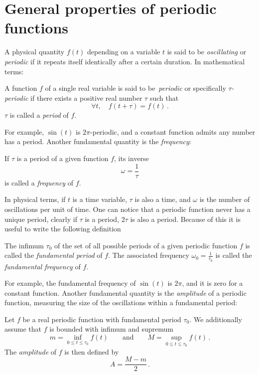 \section{General properties of periodic functions}
A physical quantity $f(t)$ depending on a variable $t$ is said to be \emph{oscillating} or
\emph{periodic} if it repeats itself identically after a certain duration. In mathematical
terms:
\begin{definition}
  A function $f$ of a single real variable is said to be~\emph{periodic} or specifically
  \emph{$\tau$-periodic} if there exists a positive real number $\tau$ such that
  \begin{equation}
    \forall t,\quad f(t+\tau)=f(t)\,.
  \end{equation}
  $\tau$ is called a \emph{period} of $f$.
\end{definition}
\noindent For example, $\sin(t)$ is $2\pi$-periodic, and a constant function admits any
number has a period. Another fundamental quantity is the \emph{frequency}:
\begin{definition}
  If $\tau$ is a period of a given function $f$, its inverse
  \begin{equation}
    \omega=\frac{1}{\tau}
  \end{equation}
  is called a \emph{frequency} of $f$.
\end{definition}
\noindent In physical terms, if $t$ is a time variable, $\tau$ is also a time, and
$\omega$ is the number of oscillations per unit of time. One can notice that a periodic
function never has a unique period, \eg clearly if $\tau$ is a period, $2\tau$ is also a
period. Because of this it is useful to write the following definition
\begin{definition}
  The infimum $\tau_0$ of the set of all possible periods of a given periodic function $f$
  is called the \emph{fundamental period} of $f$. The associated frequency
  $\omega_0=\frac{1}{\tau_0}$ is called the \emph{fundamental frequency} of $f$.
\end{definition}
\noindent For example, the fundamental frequency of $\sin(t)$ is $2\pi$, and it is zero
for a constant function. Another fundamental quantity is the \emph{amplitude} of a
periodic function, measuring the size of the oscillations within a fundamental period:
\begin{definition}
  \label{def:amplitude}
  Let $f$ be a real periodic function with fundamental period $\tau_0$. We additionally
  assume that $f$ is bounded with infimum and supremum
  \begin{equation}
    m=\inf_{0\leq t\leq \tau_0}f(t)\qquad\text{and}\qquad M=\sup_{0\leq t\leq \tau_0}f(t)\,.
  \end{equation}
  The \emph{amplitude} of $f$ is then defined by
  \begin{equation}
    A=\frac{M-m}{2}\,.
  \end{equation}
\end{definition}
